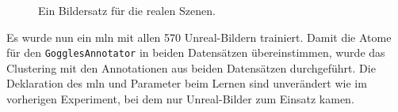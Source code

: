 \begin{figure}
\begin{subfigure}[b]{0.3\textwidth}
	\end{subfigure}
\caption[Reale Bilder einer Szene]{Ein Bildersatz für die realen Szenen.}
\label{fig:exampleSceneReal}
\end{figure}

Es wurde nun ein \gls{mln} mit allen 570 Unreal-Bildern trainiert. Damit die Atome für den \texttt{GogglesAnnotator} in beiden Datensätzen übereinstimmen, wurde das Clustering mit den Annotationen aus beiden Datensätzen durchgeführt. Die Deklaration des \gls{mln} und Parameter beim Lernen sind unverändert wie im vorherigen Experiment, bei dem nur Unreal-Bilder zum Einsatz kamen.   